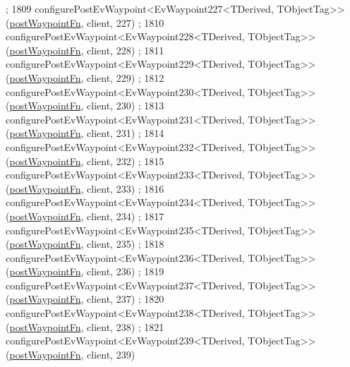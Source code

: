 \begin{DoxyCode}
      ;
1809     configurePostEvWaypoint<EvWaypoint227<TDerived, TObjectTag>>(\hyperlink{classcl__move__base__z_1_1WaypointEventDispatcher_a964a57fcce5d48ec60243230722d8dd7}{postWaypointFn}, client, 227)
      ;
1810     configurePostEvWaypoint<EvWaypoint228<TDerived, TObjectTag>>(\hyperlink{classcl__move__base__z_1_1WaypointEventDispatcher_a964a57fcce5d48ec60243230722d8dd7}{postWaypointFn}, client, 228)
      ;
1811     configurePostEvWaypoint<EvWaypoint229<TDerived, TObjectTag>>(\hyperlink{classcl__move__base__z_1_1WaypointEventDispatcher_a964a57fcce5d48ec60243230722d8dd7}{postWaypointFn}, client, 229)
      ;
1812     configurePostEvWaypoint<EvWaypoint230<TDerived, TObjectTag>>(\hyperlink{classcl__move__base__z_1_1WaypointEventDispatcher_a964a57fcce5d48ec60243230722d8dd7}{postWaypointFn}, client, 230)
      ;
1813     configurePostEvWaypoint<EvWaypoint231<TDerived, TObjectTag>>(\hyperlink{classcl__move__base__z_1_1WaypointEventDispatcher_a964a57fcce5d48ec60243230722d8dd7}{postWaypointFn}, client, 231)
      ;
1814     configurePostEvWaypoint<EvWaypoint232<TDerived, TObjectTag>>(\hyperlink{classcl__move__base__z_1_1WaypointEventDispatcher_a964a57fcce5d48ec60243230722d8dd7}{postWaypointFn}, client, 232)
      ;
1815     configurePostEvWaypoint<EvWaypoint233<TDerived, TObjectTag>>(\hyperlink{classcl__move__base__z_1_1WaypointEventDispatcher_a964a57fcce5d48ec60243230722d8dd7}{postWaypointFn}, client, 233)
      ;
1816     configurePostEvWaypoint<EvWaypoint234<TDerived, TObjectTag>>(\hyperlink{classcl__move__base__z_1_1WaypointEventDispatcher_a964a57fcce5d48ec60243230722d8dd7}{postWaypointFn}, client, 234)
      ;
1817     configurePostEvWaypoint<EvWaypoint235<TDerived, TObjectTag>>(\hyperlink{classcl__move__base__z_1_1WaypointEventDispatcher_a964a57fcce5d48ec60243230722d8dd7}{postWaypointFn}, client, 235)
      ;
1818     configurePostEvWaypoint<EvWaypoint236<TDerived, TObjectTag>>(\hyperlink{classcl__move__base__z_1_1WaypointEventDispatcher_a964a57fcce5d48ec60243230722d8dd7}{postWaypointFn}, client, 236)
      ;
1819     configurePostEvWaypoint<EvWaypoint237<TDerived, TObjectTag>>(\hyperlink{classcl__move__base__z_1_1WaypointEventDispatcher_a964a57fcce5d48ec60243230722d8dd7}{postWaypointFn}, client, 237)
      ;
1820     configurePostEvWaypoint<EvWaypoint238<TDerived, TObjectTag>>(\hyperlink{classcl__move__base__z_1_1WaypointEventDispatcher_a964a57fcce5d48ec60243230722d8dd7}{postWaypointFn}, client, 238)
      ;
1821     configurePostEvWaypoint<EvWaypoint239<TDerived, TObjectTag>>(\hyperlink{classcl__move__base__z_1_1WaypointEventDispatcher_a964a57fcce5d48ec60243230722d8dd7}{postWaypointFn}, client, 239)

\end{DoxyCode}
